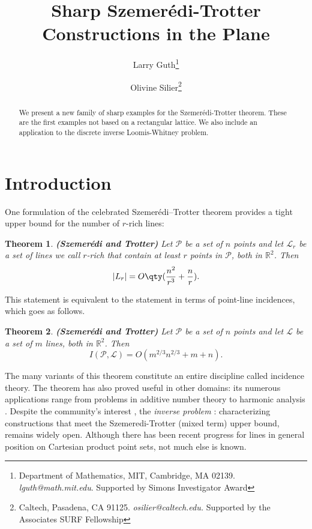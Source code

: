 \documentclass[11pt]{article}
\newtheorem{theorem}{Theorem}[section]
\newcounter{problems}
\newcommand{\RR}{\ensuremath{\mathbb R}}
\newcommand{\pts}{\mathcal P}
\newcommand{\lines}{\mathcal L}
\begin{document}

\title{Sharp Szemer\'edi-Trotter Constructions in the Plane}

\author{
Larry Guth\thanks{Department of Mathematics, MIT, Cambridge, MA 02139.
{\sl lguth@math.mit.edu}. Supported by Simons Investigator Award}
\and
Olivine Silier\thanks{Caltech, Pasadena, CA 91125.
{\sl osilier@caltech.edu.} Supported by the Associates SURF Fellowship}}


\maketitle

\begin{abstract}
We present a new family of sharp examples for the Szemer\'edi-Trotter theorem.  These are the first examples not based on a rectangular lattice.  We also include an application to the discrete inverse Loomis-Whitney problem.
\end{abstract}


\section{Introduction}

One formulation of the celebrated Szemer\'edi--Trotter theorem \cite{ST83} provides a tight upper bound for the number of $r$-rich lines:

\begin{theorem}{\bf (Szemer\'edi and Trotter)} \label{th:dualSzemTrot}
Let $\pts$ be a set of $n$ points and let $\lines_r$ be a set of lines we call \textit{$r$-rich} that contain at least $r$ points in $\pts$, both in $\RR^2$. Then
%
\[ |L_r| = O\qty(\frac{n^2}{r^3} + \frac{n}{r}). \]
%
\end{theorem}

This statement is equivalent to the statement in terms of point-line incidences, which goes as follows.

\begin{theorem}{\bf (Szemer\'edi and Trotter)} \label{th:SzemTrot}
Let $\pts$ be a set of $n$ points and let $\lines$ be a set of $m$ lines, both in $\RR^2$. Then
%
\[ I(\pts,\lines) = O(m^{2/3}n^{2/3}+m+n). \]
%
\end{theorem}

The many variants of this theorem constitute an entire discipline called incidence theory. The theorem has also proved useful in other domains: its numerous applications range from problems in additive number theory to harmonic analysis  \cite{bombieri2015problem,BD15,CGS16,katz2019improved,singer2021point}. Despite the community's interest \cite{ABCP,Elekes97b,Elek02,Solymosi06}, the \textit{inverse problem} : characterizing constructions that meet the Szemeredi-Trotter (mixed term) upper bound, remains widely open. Although there has been recent progress for lines in general position on Cartesian product point sets, \cite{CL,Murphy} not much else is known. 
\end{document}
